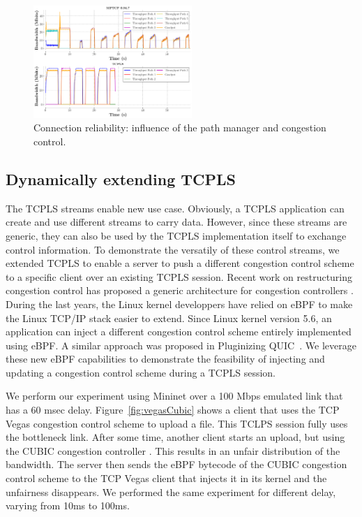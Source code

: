 \begin{figure}[!t]
  \begin{center}
    \includegraphics[width=6cm]{figures/tcpls_mptcp.png}
  \end{center}
  \caption{Connection reliability: influence of the path manager and congestion
  control.}
\end{figure}



\subsection{Dynamically extending TCPLS}
The TCPLS streams enable new use case. Obviously, a TCPLS application can
create and use different streams to carry data. However, since these streams
are generic, they can also be used by the TCPLS implementation itself to
exchange control information. To demonstrate the versatily of these control
streams, we extended TCPLS to enable a server to push a different congestion
control scheme to a specific client over an existing TCPLS session. Recent
work on restructuring congestion control has proposed a generic architecture
for congestion controllers \cite{narayan2018restructuring}. 
During the last years, the Linux kernel developpers have relied on eBPF
to make the Linux TCP/IP stack \cite{brakmo2017tcp,tran2020beyond} easier
to extend. Since Linux kernel version 5.6, an application can inject
a different congestion control scheme entirely implemented using eBPF. A similar approach was proposed in Pluginizing QUIC~\cite{de2019pluginizing}.
We leverage these new eBPF capabilities to
demonstrate the feasibility of injecting and
updating a congestion control scheme during a TCPLS session.

We perform our experiment using Mininet over a 100 Mbps emulated link that has a 60 msec delay. Figure~\ref{fig:vegasCubic} shows a client that uses the TCP Vegas \cite{10.1145/190314.190317} congestion control scheme to upload a file. This TCLPS session fully uses the bottleneck link. After some time, another client starts an upload, but using the CUBIC congestion controller \cite{rfc8312}. This results in an unfair distribution of the bandwidth. The server then sends the eBPF bytecode of the CUBIC congestion control scheme to the TCP Vegas client that injects it in its kernel and the unfairness disappears.  We performed the same experiment for different delay, varying from 10ms to 100ms. 

